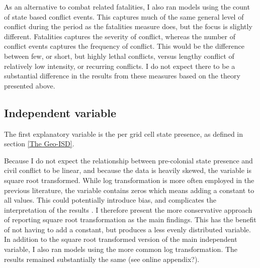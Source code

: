 \documentclass[12pt]{article}
\begin{document}
As an alternative to combat related fatalities, I also ran models using the
count of state based conflict events. This captures much of the same general
level of conflict during the period as the fatalities measure does, but the
focus is slightly different. Fatalities captures the severity of conflict,
whereas the number of conflict events captures the frequency of conflict. This
would be the difference between few, or short, but highly lethal conflicts,
versus lengthy conflict of relatively low intensity, or recurring conflicts. I
do not expect there to be a substantial difference in the results from these
measures based on the theory presented above.


\subsection{Independent variable} \label{Independent variable}

The first explanatory variable is the per grid cell state presence, as defined in
section \ref{The Geo-ISD}.


Because I do not expect the relationship between pre-colonial state presence and
civil conflict to be linear, and because the data is heavily skewed, the
variable is square root transformed. While log transformation is more often
employed in the previous literature, the variable contains zeros which means
adding a constant to all values. This could potentially introduce bias, and
complicates the interpretation of the results \citep{Ekwaru_2018}. I therefore
present the more conservative approach of reporting square root transformation
as the main findings. This has the benefit of not having to add a constant, but
produces a less evenly distributed variable. In addition to the square root
transformed version of the main independent variable, I also ran models using
the more common log transformation. The results remained substantially the same
(see online appendix?). 
\end{document}
